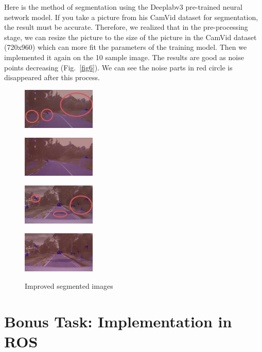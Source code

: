 \documentclass[10pt]{article}
\theoremstyle{nonumberplain}
\begin{document}
Here is the method of segmentation using the Deeplabv3 pre-trained neural network model. If you take a picture from his CamVid dataset for segmentation, the result must be accurate. Therefore, we realized that in the pre-processing stage, we can resize the picture to the size of the picture in the CamVid dataset (720x960) which can more fit the parameters of the training model. Then we implemented it again on the 10 sample image. The results are good as noise points decreasing (Fig.~\ref{fig6}). We can see the noise parts in red circle is disappeared after this process.

\begin{figure}[H]
	\centering
	\begin{minipage}[t]{0.24\textwidth}
		\centering
		\includegraphics[width=3.5cm]{fig7a.jpg}
		\label{fig7a}
	\end{minipage}
	\begin{minipage}[t]{0.24\textwidth}
		\centering
		\includegraphics[width=3.5cm]{fig7b.jpg}
		\label{fig7b}
	\end{minipage}
	\begin{minipage}[t]{0.24\textwidth}
		\centering
		\includegraphics[width=3.5cm]{fig7c.jpg}
		\label{fig7c}
	\end{minipage}
	\begin{minipage}[t]{0.24\textwidth}
		\centering
		\includegraphics[width=3.5cm]{fig7d.jpg}
		\label{fig7d}
	\end{minipage}
	\caption{Improved segmented images}
	\label{fig7}
\end{figure}



\section{Bonus Task: Implementation in ROS}

\hspace{1.0em}














	
\end{document}
